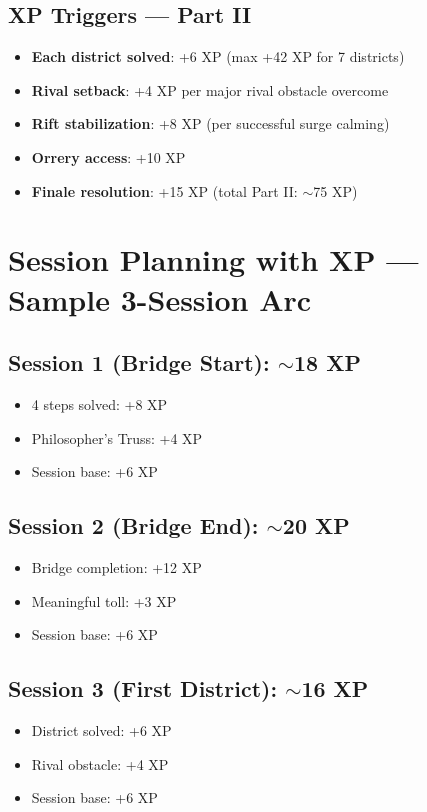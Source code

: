 \documentclass[11pt]{article}
\begin{document}
\subsection*{XP Triggers --- Part II}
\begin{itemize}
\item \textbf{Each district solved}: +6 XP (max +42 XP for 7 districts)
\item \textbf{Rival setback}: +4 XP per major rival obstacle overcome
\item \textbf{Rift stabilization}: +8 XP (per successful surge calming)
\item \textbf{Orrery access}: +10 XP
\item \textbf{Finale resolution}: +15 XP (total Part II: $\sim$75 XP)
\end{itemize}

\section{Session Planning with XP --- Sample 3-Session Arc}
\label{app:sessions}
\subsection*{Session 1 (Bridge Start): $\sim$18 XP}
\begin{itemize}
\item 4 steps solved: +8 XP
\item Philosopher's Truss: +4 XP
\item Session base: +6 XP
\end{itemize}

\subsection*{Session 2 (Bridge End): $\sim$20 XP}
\begin{itemize}
\item Bridge completion: +12 XP
\item Meaningful toll: +3 XP
\item Session base: +6 XP
\end{itemize}

\subsection*{Session 3 (First District): $\sim$16 XP}
\begin{itemize}
\item District solved: +6 XP
\item Rival obstacle: +4 XP
\item Session base: +6 XP
\end{itemize}
\end{document}

